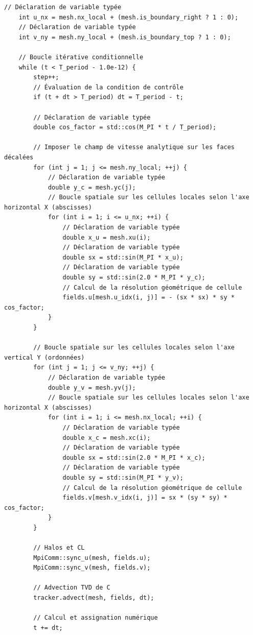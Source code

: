 \documentclass[10pt,a4paper,oneside]{book}
\begin{document}
\begin{lstlisting}[language={[11]C++}]
    // Déclaration de variable typée
    int u_nx = mesh.nx_local + (mesh.is_boundary_right ? 1 : 0);
    // Déclaration de variable typée
    int v_ny = mesh.ny_local + (mesh.is_boundary_top ? 1 : 0);

    // Boucle itérative conditionnelle
    while (t < T_period - 1.0e-12) {
        step++;
        // Évaluation de la condition de contrôle
        if (t + dt > T_period) dt = T_period - t;

        // Déclaration de variable typée
        double cos_factor = std::cos(M_PI * t / T_period);

        // Imposer le champ de vitesse analytique sur les faces décalées
        for (int j = 1; j <= mesh.ny_local; ++j) {
            // Déclaration de variable typée
            double y_c = mesh.yc(j);
            // Boucle spatiale sur les cellules locales selon l'axe horizontal X (abscisses)
            for (int i = 1; i <= u_nx; ++i) {
                // Déclaration de variable typée
                double x_u = mesh.xu(i);
                // Déclaration de variable typée
                double sx = std::sin(M_PI * x_u);
                // Déclaration de variable typée
                double sy = std::sin(2.0 * M_PI * y_c);
                // Calcul de la résolution géométrique de cellule
                fields.u[mesh.u_idx(i, j)] = - (sx * sx) * sy * cos_factor;
            }
        }

        // Boucle spatiale sur les cellules locales selon l'axe vertical Y (ordonnées)
        for (int j = 1; j <= v_ny; ++j) {
            // Déclaration de variable typée
            double y_v = mesh.yv(j);
            // Boucle spatiale sur les cellules locales selon l'axe horizontal X (abscisses)
            for (int i = 1; i <= mesh.nx_local; ++i) {
                // Déclaration de variable typée
                double x_c = mesh.xc(i);
                // Déclaration de variable typée
                double sx = std::sin(2.0 * M_PI * x_c);
                // Déclaration de variable typée
                double sy = std::sin(M_PI * y_v);
                // Calcul de la résolution géométrique de cellule
                fields.v[mesh.v_idx(i, j)] = sx * (sy * sy) * cos_factor;
            }
        }

        // Halos et CL
        MpiComm::sync_u(mesh, fields.u);
        MpiComm::sync_v(mesh, fields.v);

        // Advection TVD de C
        tracker.advect(mesh, fields, dt);

        // Calcul et assignation numérique
        t += dt;


\end{lstlisting}
\end{document}
